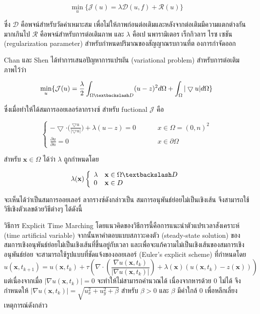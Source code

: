 \documentclass[hidelinks,a4paper,14pt]{article}
\numberwithin{equation}{section}							%
\begin{document}
{$$\min_{u} \{ \mathcal{J}(u)= \lambda \mathcal{D}(u,f)+  \mathcal{R}(u) \}$$

ซึ่ง $ \mathcal{D} $ คือพจน์สำหรับวัดค่าเหมาะสม เพื่อไม่ให้ภาพก่อนต่อเติมและหลังจากต่อเติมมีความแตกต่างกันมากเกินไป $ \mathcal{R} $ คือพจน์สำหรับการต่อเติมภาพ และ $ \lambda $  คือเปนพารามิเตอรเร็กกิวลารไรซเซชัน (regularization parameter) สำหรับกำหนดปริมาณของสัญญาณรบกวนที่ตองการกำจัดออก 

\hspace{1cm} Chan และ Shen ได้ทำการเสนอปัญหาการแปรผัน (variational problem) สำหรับการต่อเติมภาพไว้ว่า

$$\min_{u} \{ \mathcal{J}(u) = \frac{\lambda}{2} \int_{\Omega \textbackslash D} (u-z)^2 d\Omega +  \int_{\Omega}  |\bigtriangledown u|  d\Omega \}$$

ซึ่งเมื่อทำให้ได้สมการออยเลอร์ลากรางซ์ สำหรับ fuctional $\mathcal{J}$ คือ 

$$ \left \{ \begin{array}{ll}  - \bigtriangledown \cdot  \Big( \frac{\bigtriangledown u}{|\bigtriangledown u|} \Big) + \lambda (u-z) = 0  & \hspace{1cm} x \in \Omega = (0,n)^2 \\ \frac{\partial u}{\partial n} = 0 & \hspace{1cm} x \in \partial \Omega \end{array} \right . $$

สำหรับ $\mathbf{x} \in \Omega$ ได้ว่า $\lambda$ ถูกกำหนดโดย

$$ \lambda(\mathbf{x}) \left \{ \begin{array}{ll}  \lambda & \mathbf{x} \in \Omega \textbackslash D \\ 0 &\mathbf{x} \in D  \end{array} \right . $$

จะเห็นได้ว่าเป็นสมการออยเลอร์ ลากรางซ์ดังกล่าวเป็น สมการอนุพันธ์ย่อยไม่เป็นเชิงเส้น จึงสามารถใช้วิธีเชิงตัวเลขด้วยวิธีต่างๆ ได้ดังนี้

\hspace{1cm}วิธีการ Explicit Time Marching  \cite{ref:ExplicitTimeMarching}  โดยแนวคิดของวิธีการนี้คือการแนะนําตัวแปรเวลาสังเคราะห์ (time artificial variable) จากนั้นหาคําตอบแบบสภาวะคงตัว (steady-state solution) ของสมการเชิงอนุพันธ์ย่อยไม่เป็นเชิงเส้นที่ขึ้นอยู่กับเวลา และเพื่อจะแก้ความไม่เป็นเชิงเส้นของสมการเชิงอนุพันธ์ย่อย จะสามารถใช้รูปแบบที่ชัดแจ้งของออยเลอร์ (Euler's explicit scheme) ที่กำหนดโดย
$$
u(\mathbf{x},t_{k+1})=u(\mathbf{x},t_{k})+\tau\left(\nabla\cdot\left(\frac{\nabla u ( \mathbf{x},t_k)}{\lvert \nabla u ( \mathbf{x},t_k) \rvert }\right) + \lambda(\mathbf{x})(u ( \mathbf{x},t_k)-z(\mathbf{x})) \right)
$$
แต่เนื่องจากเมื่อ $\lvert \nabla u ( \mathbf{x},t_k) \rvert = 0 $ จะทำให้ไม่สามารถคำนวณได้ เนื่องจากหารด้วย 0 ไม่ได้ จึงกำหนดให้ $\lvert \nabla u ( \mathbf{x},t_k) \rvert = \sqrt{u_x^2+u_y^2 + \beta}$ สำหรับ $\beta > 0$ และ $\beta$ มีค่าใกล้ 0 เพื่อหลีกเลี่ยงเหตุการณ์ดังกล่าว

}
\end{document}
